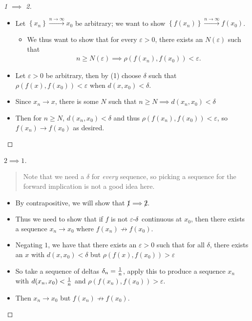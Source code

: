 \begin{solution}

\envlist

\begin{proof}[1 $\implies$ 2]

\envlist

\begin{itemize}
\tightlist
\item
  Let \(\left\{{x_n}\right\} \overset{n\to\infty}\to x_0\) be arbitrary;
  we want to show
  \(\left\{{f(x_n)}\right\}\overset{n\to\infty}\to f(x_0)\).

  \begin{itemize}
  \tightlist
  \item
    We thus want to show that for every \(\varepsilon>0\), there exists
    an \(N(\varepsilon)\) such that
    \begin{align*}n\geq N(\varepsilon) \implies \rho(f(x_n),  f(x_0)) < \varepsilon.\end{align*}
  \end{itemize}
\item
  Let \(\varepsilon>0\) be arbitrary, then by (1) choose \(\delta\) such
  that \(\rho(f(x), f(x_0)) < \varepsilon\) when \(d(x, x_0) < \delta\).
\item
  Since \(x_n\to x\), there is some \(N\) such that
  \(n\geq N \implies d(x_n, x_0) < \delta\)
\item
  Then for \(n\geq N\), \(d(x_n, x_0) < \delta\) and thus
  \(\rho(f(x_n), f(x_0)) < \varepsilon\), so \(f(x_n)\to f(x_0)\) as
  desired.
\end{itemize}

\end{proof}

\begin{proof}[$2\implies 1$]

\begin{quote}
Note that we need a \(\delta\) for \emph{every} sequence, so picking a
sequence for the forward implication is not a good idea here.
\end{quote}

\begin{itemize}
\tightlist
\item
  By contrapositive, we will show that \(\not 1\implies \not 2\).
\item
  Thus we need to show that if \(f\) is not
  \(\varepsilon{\hbox{-}}\delta\) continuous at \(x_0\), then there
  exists a sequence \(x_n\to x_0\) where \(f(x_n)\not\to f(x_0)\).
\item
  Negating \(1\), we have that there exists an \(\varepsilon>0\) such
  that for all \(\delta\), there exists an \(x\) with
  \(d(x, x_0) < \delta\) but \(\rho(f(x), f(x_0))>\varepsilon\)
\item
  So take a sequence of deltas \(\delta_n = {1\over n}\), apply this to
  produce a sequence \(x_n\) with \(d(x_n, x_0) < {1\over n}\) and
  \(\rho(f(x_n), f(x_0)) > \varepsilon\).
\item
  Then \(x_n \to x_0\) but \(f(x_n) \not\to f(x_0)\).
\end{itemize}


\end{proof}
\end{solution}
